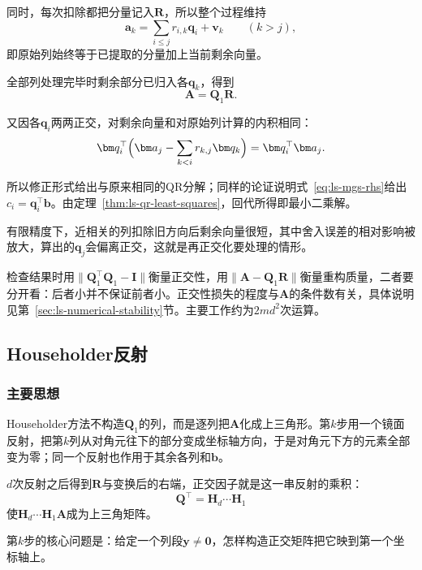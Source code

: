 同时，每次扣除都把分量记入$\bm R$，所以整个过程维持
\begin{equation}
 \bm a_k=\sum_{i\leq j}r_{i,k}\bm q_i+\bm v_k\qquad(k>j),
 \label{eq:ls-mgs-invariant}
\end{equation}
即原始列始终等于已提取的分量加上当前剩余向量。

全部列处理完毕时剩余部分已归入各$\bm q_k$，得到
\[
  \bm A=\bm Q_1\bm R .
\]

又因各$\bm q_i$两两正交，对剩余向量和对原始列计算的内积相同：
\begin{equation}
  \bm q_i^\top\Bigl(\bm a_j-\sum_{k<i}r_{k,j}\bm q_k\Bigr)=\bm q_i^\top\bm a_j .
 \label{eq:ls-mgs-cgs-equivalence}
\end{equation}

所以修正形式给出与原来相同的QR分解；同样的论证说明式~\eqref{eq:ls-mgs-rhs}给出$c_i=\bm q_i^\top\bm b$。由定理~\ref{thm:ls-qr-least-squares}，回代所得即最小二乘解。

有限精度下，近相关的列扣除旧方向后剩余向量很短，其中舍入误差的相对影响被放大，算出的$\bm q_j$会偏离正交，这就是再正交化要处理的情形。

检查结果时用$\lVert\bm Q_1^\top\bm Q_1-\bm I\rVert$衡量正交性，用$\lVert\bm A-\bm Q_1\bm R\rVert$衡量重构质量，二者要分开看：后者小并不保证前者小。正交性损失的程度与$\bm A$的条件数有关，具体说明见第~\ref{sec:ls-numerical-stability}节。主要工作约为$2md^2$次运算。

\subsection{Householder反射}
\label{sec:ls-householder}

\subsubsection{主要思想}
Householder方法不构造$\bm Q_1$的列，而是逐列把$\bm A$化成上三角形。第$k$步用一个镜面反射，把第$k$列从对角元往下的部分变成坐标轴方向，于是对角元下方的元素全部变为零；同一个反射也作用于其余各列和$\bm b$。

$d$次反射之后得到$\bm R$与变换后的右端，正交因子就是这一串反射的乘积：
\begin{equation}
  \bm Q^\top=\bm H_d\cdots\bm H_1
 \label{eq:ls-householder-qt}
\end{equation}
使$\bm H_d\cdots\bm H_1\bm A$成为上三角矩阵。

第$k$步的核心问题是：给定一个列段$\bm y\neq\bm0$，怎样构造正交矩阵把它映到第一个坐标轴上。

